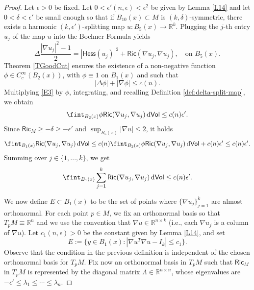 \documentclass[10pt]{article}
\theoremstyle{definition}
\newcommand{\bb}[1]{\mathbb{#1}}
\newcommand{\ssf}[1]{\mathsf{#1}}
\newcommand{\Ric}{\mathsf{Ric}}
\newcommand{\Hess}{\mathsf{Hess}}
\newcommand{\de}{{\rm d}}
\begin{document}
       
        \begin{proof}
            Let $\epsilon>0$ be fixed. Let $0<\epsilon'(n,\epsilon)<\epsilon^2$ be given by Lemma \ref{L14} and let  $0<\delta<\epsilon'$ be small enough so that if $B_{10}(x) \subset M$ is $(k,\delta)$-symmetric, there exists a harmonic $(k,\epsilon')$-splitting map $u:B_5(x) \to \bb{R}^k$. 
            Plugging the $j$-th entry $u_j$ of the map $u$ into the Bochner Formula yields
            \begin{equation} \label{E3}
            \Delta \frac{|\nabla u_j|^2-1}{2}=|\Hess (u_j)|^2+\Ric(\nabla u_j,\nabla u_j), \quad \text{on $B_5(x)$}.
            \end{equation}
            Theorem \ref{TGoodCut} ensures the existence of a  non-negative function  $\phi \in C^\infty_c(B_2(x))$, with $\phi\equiv 1$ on $B_1(x)$ and such that 
            \[
            |\Delta \phi|+|\nabla \phi| \leq c(n).
            \]
            Multiplying \eqref{E3} by $\phi$, integrating, and recalling Definition \ref{def:delta-split-map}, we obtain
            \[
            \fint_{B_2(x)} \phi \Ric(\nabla u_j,\nabla u_j)  \,\de\ssf{Vol} \leq c(n) \epsilon'.
            \]
            Since $\Ric_{M} \geq -\delta \geq -\epsilon'$ and $\sup_{B_5(x)} |\nabla u| \leq 2$, it holds
            \[
            \fint_{B_1(x)}  \Ric(\nabla u_j,\nabla u_j)  \,\de\ssf{Vol} \leq
            c(n)\fint_{B_2(x)} \phi \Ric(\nabla u_j,\nabla u_j)  \,\de\ssf{Vol}  + c(n)\epsilon'
            \leq c(n) \epsilon'.
            \]
            Summing over $j \in \{1, ..., k\}$, we get
            \begin{equation} \label{E1}
            \fint_{B_1(x)} \sum_{j=1}^k \Ric(\nabla u_j,\nabla u_j)  \,\de\ssf{Vol} \leq c(n) \epsilon'.
            \end{equation}
            \par
            We now define $E \subset B_1(x)$ to be the set of points where $\{\nabla u_j\}_{j=1}^k$ are almost orthonormal. For each point $p \in M$, we fix an orthonormal basis so that $T_pM \equiv \bb{R}^n$ and we use the convention that $\nabla u \in \bb{R}^{n \times k}$ (i.e., each $\nabla u_j$ is a column of $\nabla u$). Let $c_1(n,\epsilon)>0$ be the constant given by Lemma \ref{L14}, and set
            \[
            E:=\{y \in B_1(x): | \nabla u^T \nabla u-I_k| \leq c_1\}.
            \]
            Observe that the condition in the previous definition is independent of the chosen orthonormal basis for $T_pM$. Fix now an orthonormal basis in $T_pM$ such that $\Ric_M$ in $T_pM$ is represented by the diagonal matrix $\Lambda \in \bb{R}^{n \times n}$, whose eigenvalues are $-\epsilon' \leq \lambda_1 \leq \cdots \leq \lambda_n$.


\end{proof}
\end{document}
